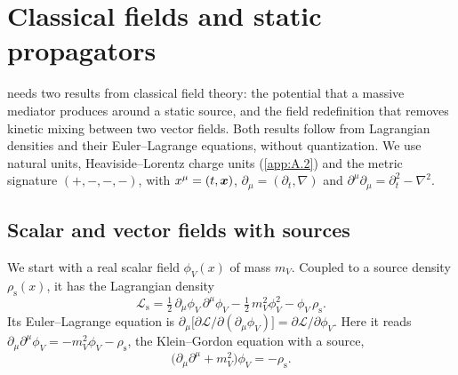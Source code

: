 \section{Classical fields and static propagators}\label{app:C.9}

 needs two results from classical field theory: the potential that a massive mediator produces around a static source, and the field redefinition that removes kinetic mixing between two vector fields. Both results follow from Lagrangian densities and their Euler--Lagrange equations, without quantization. We use natural units, Heaviside--Lorentz charge units (\cref{app:A.2}) and the metric signature $(+,-,-,-)$, with $x^\mu = (t, \bm{x})$, $\partial_\mu = (\partial_t, \nabla)$ and $\partial^\mu\partial_\mu = \partial_t^2 - \nabla^2$.

\subsection{Scalar and vector fields with sources}

We start with a real scalar field $\phi_V(x)$ of mass $m_V$. Coupled to a source density $\rho_{\mathrm{s}}(x)$, it has the Lagrangian density
\begin{equation}
  \mathcal{L}_{\mathrm{s}} = \tfrac12\,\partial_\mu\phi_V\,\partial^\mu\phi_V - \tfrac12\,m_V^2\phi_V^2 - \phi_V\,\rho_{\mathrm{s}} .
  \label{eq:C.9-Ls}
\end{equation}
Its Euler--Lagrange equation is $\partial_\mu\bigl[\partial\mathcal{L}/\partial(\partial_\mu\phi_V)\bigr] = \partial\mathcal{L}/\partial\phi_V$. Here it reads $\partial_\mu\partial^\mu\phi_V = -m_V^2\phi_V - \rho_{\mathrm{s}}$, the Klein--Gordon equation with a source,
\begin{equation}
  \bigl(\partial_\mu\partial^\mu + m_V^2\bigr)\phi_V = -\rho_{\mathrm{s}} .
  \label{eq:C.9-KG}
\end{equation}

